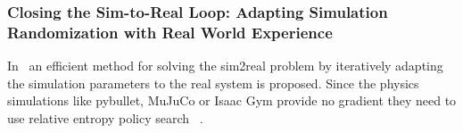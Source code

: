 \documentclass[a4paper]{article}
\begin{document}


\subsubsection{Closing the Sim-to-Real Loop: Adapting Simulation Randomization with Real World Experience}
In~\cite{Chebotar2018} an efficient method for solving the sim2real problem by iteratively adapting the simulation parameters to the real system is proposed.
Since the physics simulations like pybullet, MuJuCo or Isaac Gym provide no gradient they need to use relative entropy policy search ~\cite{peters2010relative}.
\end{document}
